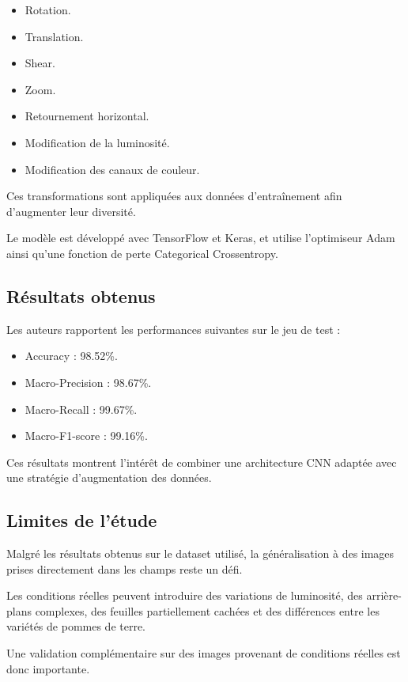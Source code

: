 \documentclass[12pt,a4paper,oneside]{report}
\begin{document}
\begin{itemize}
    \item Rotation.
    \item Translation.
    \item Shear.
    \item Zoom.
    \item Retournement horizontal.
    \item Modification de la luminosité.
    \item Modification des canaux de couleur.
\end{itemize}

Ces transformations sont appliquées aux données
d'entraînement afin d'augmenter leur diversité.

Le modèle est développé avec TensorFlow et Keras,
et utilise l'optimiseur Adam ainsi qu'une fonction
de perte Categorical Crossentropy.

\subsection{Résultats obtenus}

Les auteurs rapportent les performances suivantes
sur le jeu de test :

\begin{itemize}
    \item Accuracy : 98.52\%.
    \item Macro-Precision : 98.67\%.
    \item Macro-Recall : 99.67\%.
    \item Macro-F1-score : 99.16\%.
\end{itemize}

Ces résultats montrent l'intérêt de combiner
une architecture CNN adaptée avec une stratégie
d'augmentation des données.

\subsection{Limites de l'étude}

Malgré les résultats obtenus sur le dataset utilisé,
la généralisation à des images prises directement
dans les champs reste un défi.

Les conditions réelles peuvent introduire des variations
de luminosité, des arrière-plans complexes, des feuilles
partiellement cachées et des différences entre les variétés
de pommes de terre.

Une validation complémentaire sur des images provenant
de conditions réelles est donc importante.
\end{document}
